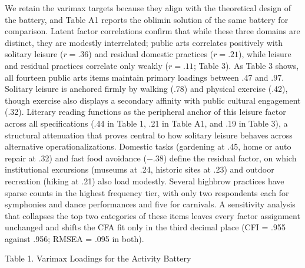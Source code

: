 \documentclass[
  12pt
]{article}
\begin{document}
We retain the varimax targets because they align with the theoretical design of the battery, and Table A1 reports the oblimin solution of the same battery for comparison. Latent factor correlations confirm that while these three domains are distinct, they are modestly interrelated; public arts correlates positively with solitary leisure ($r = .36$) and residual domestic practices ($r = .21$), while leisure and residual practices correlate only weakly ($r = .11$; Table 3). As Table 3 shows, all fourteen public arts items maintain primary loadings between .47 and .97. Solitary leisure is anchored firmly by walking (.78) and physical exercise (.42), though exercise also displays a secondary affinity with public cultural engagement (.32). Literary reading functions as the peripheral anchor of this leisure factor across all specifications (.44 in Table 1, .21 in Table A1, and .19 in Table 3), a structural attenuation that proves central to how solitary leisure behaves across alternative operationalizations. Domestic tasks (gardening at .45, home or auto repair at .32) and fast food avoidance ($-.38$) define the residual factor, on which institutional excursions (museums at .24, historic sites at .23) and outdoor recreation (hiking at .21) also load modestly. Several highbrow practices have sparse counts in the highest frequency tier, with only two respondents each for symphonies and dance performances and five for carnivals. A sensitivity analysis that collapses the top two categories of these items leaves every factor assignment unchanged and shifts the CFA fit only in the third decimal place (CFI = .955 against .956; RMSEA = .095 in both).


Table 1. Varimax Loadings for the Activity Battery
\end{document}
